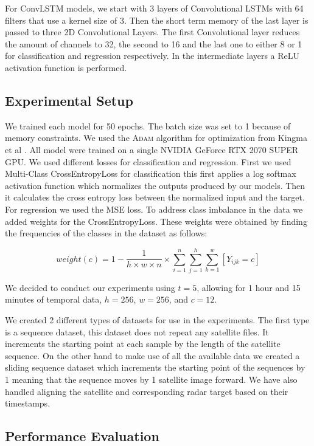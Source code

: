 For ConvLSTM models, we start with 3 layers of Convolutional LSTMs
with 64 filters that use a kernel size of 3.
Then the short term memory of the last layer is passed to three 2D Convolutional Layers.
The first Convolutional layer reduces the amount of channels to 32, the second to 16 and the last one to either 8 or 1 for classification and regression respectively.
In the intermediate layers a ReLU \cite{relu} activation function is performed.

\subsection{Experimental Setup}
We trained each model for 50 epochs. The batch size was set to 1 because of memory constraints. We used the \textsc{Adam} algorithm for optimization from Kingma et al \cite{kingma-2014}.
All model were trained on a single NVIDIA GeForce RTX 2070 SUPER GPU. We used different losses for classification and regression.
First we used Multi-Class CrossEntropyLoss for classification this first applies a log softmax activation function which normalizes the
outputs produced by our models. Then it calculates the cross entropy loss between the normalized input and the target.
For regression we used the MSE loss. To address class imbalance in the data we added weights for the CrossEntropyLoss. These weights were
obtained by finding the frequencies of the classes in the dataset as follows:

\begin{equation}
  weight(c) = 1 - \frac{1}{h\times w \times n} \times \sum_{i=1}^n \sum_{j=1}^h \sum_{k=1}^w [Y_{ijk} = c]
\end{equation}

We decided to conduct our experiments using $t = 5$, allowing for 1 hour and 15 minutes of temporal data, $h = 256$, $w = 256$, and $c = 12$.

We created 2 different types of datasets for use in the experiments.
The first type is a sequence dataset, this dataset does not repeat any satellite files. It increments the starting point at each sample
by the length of the satellite sequence. On the other hand to make use of all the available data we created a sliding sequence dataset which increments the starting point of the sequences by 1 meaning that the sequence moves by
1 satellite image forward. We have also handled aligning the satellite and corresponding radar target based on their timestamps. 

\subsection{Performance Evaluation}


